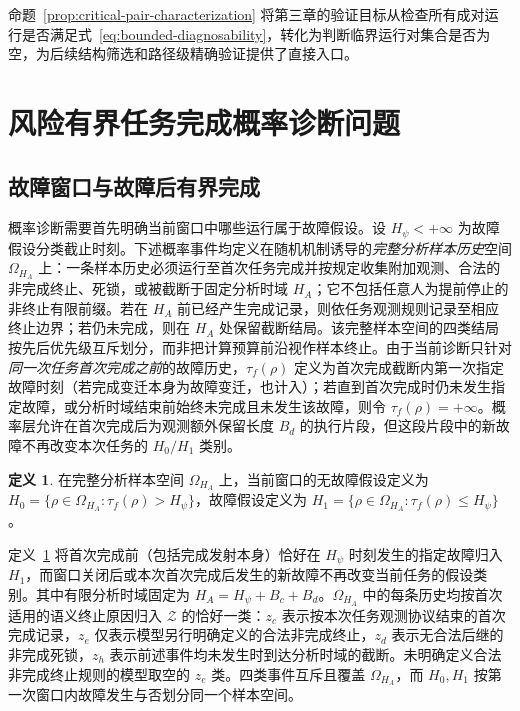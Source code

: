 \documentclass[master,fontset=ubuntu]{shnuthesis}
\theoremstyle{definition}
\newtheorem{thesisdefinition}{定义}
\begin{document}
命题~\ref{prop:critical-pair-characterization} 将第三章的验证目标从检查所有成对运行是否满足式~\eqref{eq:bounded-diagnosability}，转化为判断临界运行对集合是否为空，为后续结构筛选和路径级精确验证提供了直接入口。

\section{风险有界任务完成概率诊断问题}

\subsection{故障窗口与故障后有界完成}

概率诊断需要首先明确当前窗口中哪些运行属于故障假设。设 \(H_\psi<+\infty\) 为故障假设分类截止时刻。下述概率事件均定义在随机机制诱导的\emph{完整分析样本历史}空间 \(\Omega_{H_A}\) 上：一条样本历史必须运行至首次任务完成并按规定收集附加观测、合法的非完成终止、死锁，或被截断于固定分析时域 \(H_A\)；它不包括任意人为提前停止的非终止有限前缀。若在 \(H_A\) 前已经产生完成记录，则依任务观测规则记录至相应终止边界；若仍未完成，则在 \(H_A\) 处保留截断结局。该完整样本空间的四类结局按先后优先级互斥划分，而非把计算预算前沿视作样本终止。由于当前诊断只针对\emph{同一次任务首次完成之前}的故障历史，\(\tau_f(\rho)\) 定义为首次完成截断内第一次指定故障时刻（若完成变迁本身为故障变迁，也计入）；若直到首次完成时仍未发生指定故障，或分析时域结束前始终未完成且未发生该故障，则令 \(\tau_f(\rho)=+\infty\)。概率层允许在首次完成后为观测额外保留长度 \(B_d\) 的执行片段，但这段片段中的新故障不再改变本次任务的 \(H_0/H_1\) 类别。

\begin{thesisdefinition}
\label{def:probability-hypotheses}
在完整分析样本空间 \(\Omega_{H_A}\) 上，当前窗口的无故障假设定义为
\(H_0=\{\rho\in\Omega_{H_A}:\tau_f(\rho)>H_\psi\}\)，故障假设定义为
\(H_1=\{\rho\in\Omega_{H_A}:\tau_f(\rho)\leq H_\psi\}\)。
\end{thesisdefinition}

定义~\ref{def:probability-hypotheses} 将首次完成前（包括完成发射本身）恰好在 \(H_\psi\) 时刻发生的指定故障归入 \(H_1\)，而窗口关闭后或本次首次完成后发生的新故障不再改变当前任务的假设类别。其中有限分析时域固定为 \(H_A=H_\psi+B_c+B_d\)。\(\Omega_{H_A}\) 中的每条历史均按首次适用的语义终止原因归入 \(\mathcal Z\) 的恰好一类：\(z_c\) 表示按本次任务观测协议结束的首次完成记录，\(z_e\) 仅表示模型另行明确定义的合法非完成终止，\(z_d\) 表示无合法后继的非完成死锁，\(z_h\) 表示前述事件均未发生时到达分析时域的截断。未明确定义合法非完成终止规则的模型取空的 \(z_e\) 类。四类事件互斥且覆盖 \(\Omega_{H_A}\)，而 \(H_0,H_1\) 按第一次窗口内故障发生与否划分同一个样本空间。
\end{document}
